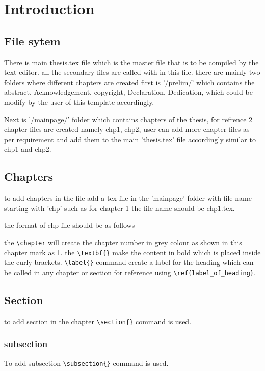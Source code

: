 \cleardoublepage
\chapter{\textbf{Introduction}}\label{ch:chp1}
\section{File sytem}
There is main thesis.tex file which is the master file that is to be compiled by the text editor. all the secondary files are called with in this file. there are mainly two folders where different chapters are created first is '/prelim/' which contains the abstract, Acknowledgement, copyright, Declaration, Dedication, which could be modify by the user of this template accordingly.

Next is '/mainpage/' folder which contains chapters of the thesis, for refrence 2 chapter files are created namely chp1, chp2, user can add more chapter files as per requirement and add them to the main 'thesis.tex' file accordingly similar to chp1 and chp2.

\section{Chapters}
 to add chapters in the file add a tex file in the 'mainpage' folder with file name starting with 'chp' such as for chapter 1 the file name should be chp1.tex.

 the format of chp file should be as follows

 the \verb|\chapter| will create the chapter number in grey colour as shown in this chapter mark as 1. the \verb|\textbf{}| make the content in bold which is placed inside the curly brackets. \verb|\label{}| command create a label for the heading which can be called in any chapter or section for reference using \verb|\ref{label_of_heading}|.
 \section{Section}
 to add section in the chapter \verb|\section{}| command is used.



 \subsection{subsection}
 To add subsection \verb|\subsection{}| command is used.

